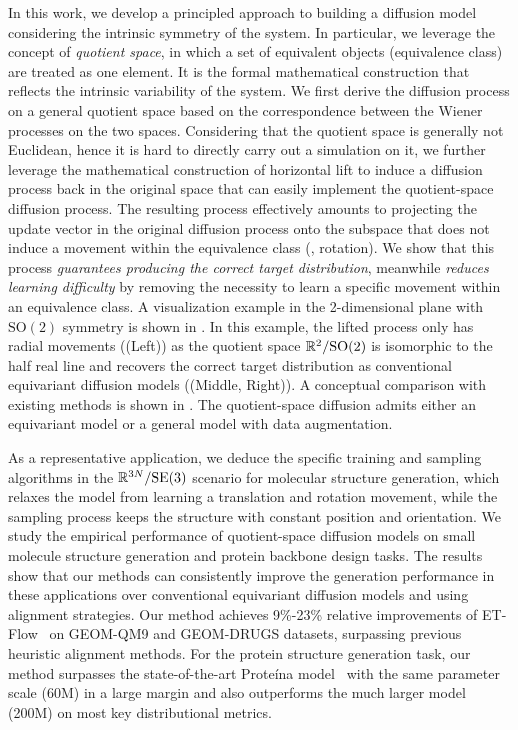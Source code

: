 \documentclass{article} %
\newcommand{\SE}{\mathrm{SE}}
\newcommand{\SO}{\mathrm{SO}}
\begin{document}
In this work, 
we develop a principled approach to building a diffusion model considering the intrinsic symmetry of the system.
In particular, we leverage the concept of \emph{quotient space}, in which a set of equivalent objects (equivalence class) are treated as one element. It is the formal mathematical construction that reflects the intrinsic variability of the system.
We first derive the diffusion process on a general quotient space based on the correspondence between the Wiener processes on the two spaces. Considering that the quotient space is generally not Euclidean, hence it is hard to 
directly carry out a simulation on it, we further leverage the mathematical construction of horizontal lift to induce a diffusion process back in the original space that can easily implement 
the quotient-space diffusion process. The resulting process effectively amounts to projecting the update vector in the original diffusion process onto the subspace that does not induce a movement within the equivalence class (\eg, rotation).
We show that this process \emph{guarantees producing the correct target distribution}, meanwhile \emph{reduces learning difficulty} by removing the necessity to learn a specific movement within an equivalence class. 
A visualization example in the 2-dimensional plane with $\SO(2)$ symmetry is shown in . In this example, the lifted process only has radial movements ((Left)) as the quotient space $\bbR^2/\SO(2)$ is isomorphic to the half real line and recovers the correct target distribution as conventional equivariant diffusion models ((Middle, Right)). %
A conceptual comparison with existing methods is shown in .
The quotient-space diffusion admits either an equivariant model or a general model with data augmentation.

As a representative application, we deduce the specific training and sampling algorithms in the $\bbR^{3N}/\SE(3)$ scenario for molecular structure generation, which relaxes the model from learning a translation and rotation movement, while the sampling process keeps the structure with constant position and orientation.
We study the empirical performance of quotient-space diffusion models on small molecule structure generation and protein backbone design tasks. The results show that our methods can consistently improve the generation performance in these applications over conventional equivariant diffusion models and using alignment strategies. 
Our method achieves 9\%-23\% relative improvements of ET-Flow~\citep{hassan2024flow} on GEOM-QM9 and GEOM-DRUGS datasets, surpassing previous heuristic alignment methods. For the protein structure generation task, our method surpasses the state-of-the-art Prote\'ina model~\citep{geffner2025proteina} with the same parameter scale (60M) in a large margin and also outperforms the much larger model (200M) on most key distributional metrics. %
\end{document}
